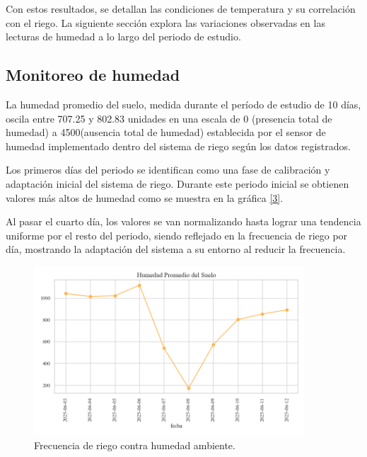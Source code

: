 \documentclass[pdflatex,sn-mathphys-num]{sn-jnl}%
\theoremstyle{thmstyleone}%
\theoremstyle{thmstyletwo}%
\theoremstyle{thmstylethree}%
\begin{document}
    
    
    \label{fig2}







Con estos resultados, se detallan las condiciones de temperatura y su correlación con el riego. La siguiente sección explora las variaciones observadas en las lecturas de humedad a lo largo del periodo de estudio.

\subsection{Monitoreo de humedad}

La humedad promedio del suelo, medida durante el período de estudio de 10 días, oscila entre 707.25 y 802.83 unidades en una escala de 0 (presencia total de humedad) a 4500(ausencia total de humedad) establecida por el sensor de humedad implementado dentro del sistema de riego según los datos registrados.

Los primeros días del periodo se identifican como una fase de calibración y adaptación inicial del sistema de riego. Durante este periodo inicial se obtienen valores más altos de humedad como se muestra en la gráfica \href{fig4}{[3]}.

Al pasar el cuarto día, los valores se van normalizando hasta lograr una tendencia uniforme por el resto del periodo, siendo reflejado en la frecuencia de riego por día, mostrando la adaptación del sistema a su entorno al reducir la frecuencia.  

\begin{figure}
  \centering
  \includegraphics[width=0.9\textwidth]{assets/humedad_promedio.png}
  \caption{Frecuencia de riego contra humedad ambiente.}
  \label{fig4}
\end{figure}
\end{document}
